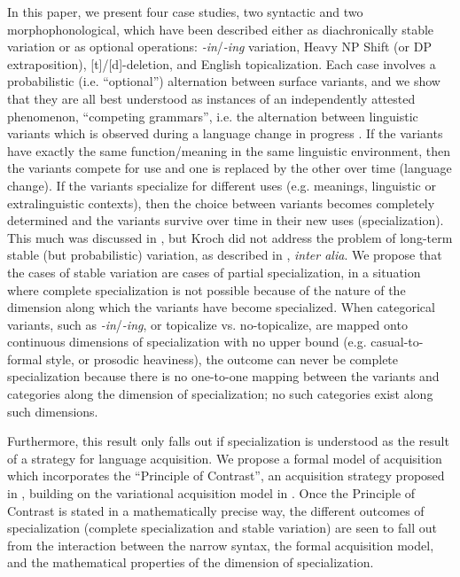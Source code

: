 \documentclass[a4paper,aps,prl,12pt,tightenlines,superscriptaddress]{revtex4}
\begin{document}
In this paper, we present four case studies, two syntactic and two morphophonological, which have been described either as diachronically stable variation or as optional operations: \textsl{-in}/\textsl{-ing} variation, Heavy NP Shift (or DP extraposition), [t]/[d]-deletion, and English topicalization.
Each case involves a probabilistic (i.e. ``optional'') alternation between surface variants, and we show that they are all best understood as instances of an independently attested phenomenon, ``competing grammars'', i.e. the alternation between linguistic variants which is observed during a language change in progress \citep[][]{kroch1989}.
If the variants have exactly the same function/meaning in the same linguistic environment, then the variants compete for use and one is replaced by the other over time (language change). 
If the variants specialize for different uses (e.g. meanings, linguistic or extralinguistic contexts), then the choice between variants becomes completely determined and the variants survive over time in their new uses (specialization). 
This much was discussed in \citep{kroch1994}, but Kroch did not address the problem of long-term stable (but probabilistic) variation, as described in \citet{labov1989}, \textsl{inter alia}. 
We propose that the cases of stable variation are cases of partial specialization, in a situation where complete specialization is not possible because of the nature of the dimension along which the variants have become specialized.
When categorical variants, such as \textsl{-in}/\textsl{-ing}, or topicalize vs. no-topicalize, are mapped onto continuous dimensions of specialization with no upper bound (e.g. casual-to-formal style, or prosodic heaviness), the outcome can never be complete specialization because there is no one-to-one mapping between the variants and categories along the dimension of specialization; no such categories exist along such dimensions.
 
Furthermore, this result only falls out if specialization is understood as the result of a strategy for language acquisition. 
We propose a formal model of acquisition which incorporates the ``Principle of Contrast'', an acquisition strategy proposed in \citet{clark1987, clark1990}, building on the variational acquisition model in \citet{yang2000}.
Once the Principle of Contrast is stated in a mathematically precise way, the different outcomes of specialization (complete specialization and stable variation) are seen to fall out from the interaction between the narrow syntax, the formal acquisition model, and the mathematical properties of the dimension of specialization.



\end{document}
